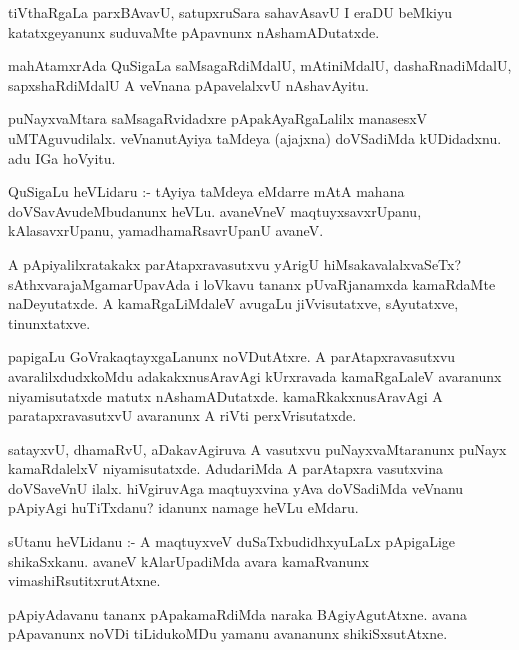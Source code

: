 \documentclass{article}
\begin{document}
\begin{mn}
tiVthaRgaLa parxBAvavU, satupxruSara sahavAsavU I eraDU beMkiyu katatxgeyanunx 
suduvaMte pApavnunx nAshamADutatxde.
\end{mn}

\begin{mn}
mahAtamxrAda QuSigaLa saMsagaRdiMdalU, mAtiniMdalU, dashaRnadiMdalU, 
sapxshaRdiMdalU A veVnana pApavelalxvU nAshavAyitu.
\end{mn}

\begin{mn}
puNayxvaMtara saMsagaRvidadxre pApakAyaRgaLalilx manasesxV uMTAguvudilalx.  
veVnanutAyiya taMdeya (ajajxna) doVSadiMda kUDidadxnu. adu IGa hoVyitu.
\end{mn}

\begin{mn}
QuSigaLu heVLidaru :- tAyiya taMdeya eMdarre mAtA mahana doVSavAvudeMbudanunx 
heVLu.  avaneVneV maqtuyxsavxrUpanu, kAlasavxrUpanu, yamadhamaRsavrUpanU avaneV.
\end{mn}

\begin{mn}
A pApiyalilxratakakx parAtapxravasutxvu yArigU hiMsakavalalxvaSeTx? 
sAthxvarajaMgamarUpavAda i loVkavu tananx  pUvaRjanamxda kamaRdaMte 
naDeyutatxde.  A kamaRgaLiMdaleV avugaLu jiVvisutatxve, sAyutatxve, tinunxtatxve.
\end{mn}

\begin{mn}
papigaLu GoVrakaqtayxgaLanunx noVDutAtxre.  A parAtapxravasutxvu  avaralilxdudxkoMdu  
adakakxnusAravAgi  kUrxravada kamaRgaLaleV avaranunx niyamisutatxde matutx 
nAshamADutatxde.  kamaRkakxnusAravAgi A paratapxravasutxvU avaranunx A riVti perxVrisutatxde.
\end{mn}

\begin{mn}
satayxvU, dhamaRvU, aDakavAgiruva A vasutxvu puNayxvaMtaranunx puNayx kamaRdalelxV 
niyamisutatxde. AdudariMda A parAtapxra vasutxvina doVSaveVnU ilalx.  hiVgiruvAga 
maqtuyxvina yAva doVSadiMda veVnanu pApiyAgi huTiTxdanu? idanunx namage heVLu eMdaru.
\end{mn}

\begin{mn}
sUtanu heVLidanu :- A maqtuyxveV duSaTxbudidhxyuLaLx pApigaLige shikaSxkanu.  
avaneV kAlarUpadiMda avara kamaRvanunx vimashiRsutitxrutAtxne.
\end{mn}

\begin{mn}
pApiyAdavanu tananx pApakamaRdiMda naraka BAgiyAgutAtxne. avana pApavanunx 
noVDi tiLidukoMDu yamanu avananunx shikiSxsutAtxne.
\end{mn}
\end{document}
